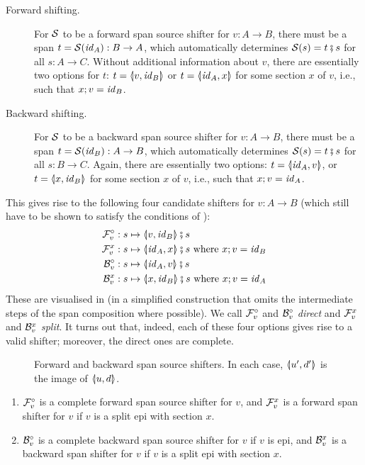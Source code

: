 \begin{description}
\item[Forward shifting.] For $\cS$ to be a forward span source shifter for $v:A\to B$, there must be a span $t=\cS(\id_A):B\to A$, which automatically determines $\cS(s)=t\spcomp s$ for all $s:A\to C$. Without additional information about $v$, there are essentially two options for $t$: $t=\spanof{v}{\id_B}$ or $t=\spanof{\id_A}{x}$ for some section $x$ of $v$, i.e., such that $x;v=\id_B$.

\item[Backward shifting.] For $\cS$ to be a backward span source shifter for $v:A\to B$, there must be a span $t=\cS(\id_B):A\to B$, which automatically determines $\cS(s)=t \spcomp s$ for all $s:B\to C$. Again, there are essentially two options: $t=\spanof{\id_A}{v}$, or $t=\spanof{x}{\id_B}$ for some section $x$ of $v$, i.e., such that $x;v=\id_A$.
\end{description}
%
This gives rise to the following four candidate shifters for $v:A\to B$ (which still have to be shown to satisfy the conditions of ):
%
\begin{align*}
\dF v & : s \mapsto \spanof{v}{\id_B}\spcomp s \\
\rF v x& : s \mapsto \spanof{\id_A}{x}\spcomp s \text{ where $x;v=\id_B$} \\
\dB v& : s \mapsto \spanof{\id_A}{v}\spcomp s \\
\rB v x& : s \mapsto \spanof{x}{\id_B}\spcomp s \text{ where $x;v=\id_A$}
\end{align*}
%
These are visualised in  (in a simplified construction that omits the intermediate steps of the span composition where possible). We call $\dF v$ and $\dB v$ \emph{direct} and $\rF v x$ and $\rB v x$ \emph{split}. It turns out that, indeed, each of these four options gives rise to a valid shifter; moreover, the direct ones are complete.
%
\begin{figure}[t]
\centering

\caption{Forward and backward span source shifters. In each case, $\spanof{u'}{d'}$ is the image of $\spanof{u}{d}$.}
\end{figure}
%
\begin{proposition}
\begin{enumerate}[topsep=\smallskipamount]
\item $\cF_v^\circ$ is a complete forward span source shifter for $v$, and $\cF_v^x$ is a forward span shifter for $v$ if $v$ is a split epi with section $x$.
\item $\cB_v^\circ$ is a complete backward span source shifter for $v$ if $v$ is epi, and $\cB_v^x$ is a backward span shifter for $v$ if $v$ is a split epi with section $x$.
\end{enumerate}
\end{proposition}
